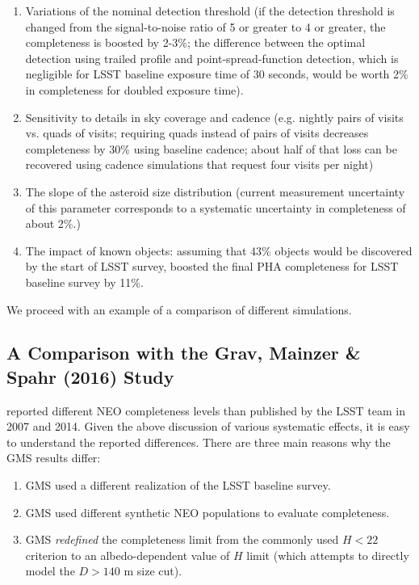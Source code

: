 \begin{enumerate}
\item Variations of the nominal detection threshold (if the detection threshold is changed from the
          signal-to-noise ratio of 5 or greater to 4 or greater, the completeness is boosted by 2-3\%;
          the difference between the optimal detection using trailed profile and point-spread-function
          detection, which is negligible for LSST baseline exposure time of 30 seconds, would be worth 2\%
          in completeness for doubled exposure time).
\item Sensitivity to details in sky coverage and cadence (e.g. nightly pairs of visits vs. quads of visits;
          requiring quads instead of pairs of visits decreases completeness by 30\% using baseline cadence;
          about half of that loss can be recovered using cadence simulations that request four visits per night)
\item The slope of the asteroid size distribution (current measurement uncertainty of this parameter
          corresponds to a systematic uncertainty in completeness of about 2\%.)
\item The impact of known objects: assuming that 43\% objects would be discovered by the start of
          LSST survey, \cite{GMS2016} boosted the final PHA completeness for LSST baseline survey by 11\%.
\end{enumerate}

We proceed with an example of a comparison of different simulations.


\subsection{A Comparison with the Grav, Mainzer \& Spahr (2016) Study \label{sec:GMS}}

\cite[hereafter GMS]{GMS2016} reported different NEO completeness levels than published by the LSST team
in 2007 and 2014. Given the above discussion of various systematic effects, it is easy to understand
the reported differences. There are three main reasons why the GMS results differ:
\begin{enumerate}
\item GMS used a different realization of the LSST baseline survey.
\item GMS used different synthetic NEO populations to evaluate completeness.
\item GMS {\it redefined} the completeness limit from the commonly
  used $H<22$ criterion to an albedo-dependent value of $H$ limit (which
  attempts to directly model the $D>140$ m size cut).
\end{enumerate}

